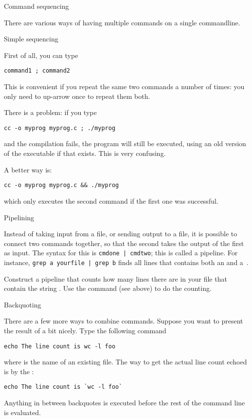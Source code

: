  {Command sequencing}
\label{tut:unix-bq}

There are various ways of having multiple commands on a single
commandline.

 {Simple sequencing}

First of all, you can type
\begin{verbatim}
command1 ; command2
\end{verbatim}
This is convenient if you repeat the same two commands a number of
times: you only need to up-arrow once to repeat them both.

There is a problem: if you type
\begin{verbatim}
cc -o myprog myprog.c ; ./myprog
\end{verbatim}
and the compilation fails, the program will still be executed,
using an old version of the executable if that exists. This is very
confusing.

A better way is:
\begin{verbatim}
cc -o myprog myprog.c && ./myprog
\end{verbatim}
which only executes the second command if the first one was
successful.

 {Pipelining}

Instead of taking input from a file, or sending output to a file, it
is possible to connect two commands together, so that the second takes
the output of the first as input. The syntax for this is
\verb+cmdone | cmdtwo+; this is called a pipeline. For instance,
\verb+grep a yourfile | grep b+ finds all lines that contains both an
 and a~.

\begin{exercise}
  Construct a pipeline that counts how many lines there are in your
  file that contain the string . Use the  command (see
  above) to do the counting.
\end{exercise}

 {Backquoting}
\label{tut:unix-backquote}

There are a few more ways to combine commands. Suppose you want to
present the result of  a bit nicely. Type the following command
\begin{verbatim}
echo The line count is wc -l foo
\end{verbatim}
where  is the name of an existing file. The way to
get the actual line count echoed is by the :
\begin{verbatim}
echo The line count is `wc -l foo`
\end{verbatim}
Anything in between backquotes is executed before the rest of the
command line is evaluated.

